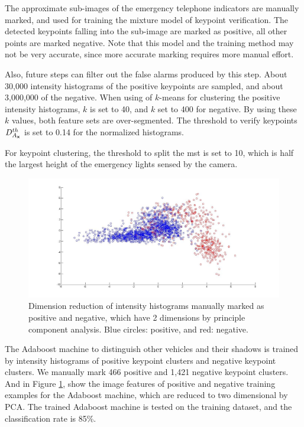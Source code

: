   
  The approximate sub-images of the emergency telephone indicators are manually marked, and used for training the mixture model of keypoint verification. The detected keypoints falling into the sub-image are marked as positive, all other points are marked negative. Note that this model and the training method may not be very accurate, since more accurate marking requires more manual effort.
  
  Also, future steps can filter out the false alarms produced by this step.  About 30,000 intensity histograms of the positive keypoints are sampled, and about 3,000,000 of the negative. When using of $k$-means for clustering the positive intensity histograms, $k$ is set to 40, and $k$ set to 400 for negative. By using these $k$ values,  both feature sets are over-segmented. The threshold to verify keypoints $D^{th}_{A_{\bf{x}}}$ is set to 0.14 for the normalized histograms.

 


For keypoint clustering, the threshold to split the mst is set to 10, which is half the largest height of the emergency lights sensed by the camera.

\begin{figure}
\includegraphics[width=1\textwidth,bb=0 0 1367 651]{untitled.jpg}
\caption[Positive and negative training examples]{Dimension reduction of intensity histograms manually marked as positive and negative, which have 2 dimensions by principle component analysis. Blue circles: positive, and red: negative.}
\label{ex1:v}
\end{figure}




 The Adaboost machine to distinguish other vehicles and their shadows is trained by intensity histograms of positive keypoint clusters and negative keypoint clusters. We manually mark 466 positive  and 1,421 negative keypoint clusters. And in Figure \ref{ex1:v}, show the image features of positive and negative training examples for the Adaboost machine, which are reduced to two dimensional by PCA. The trained Adaboost machine is tested on the training dataset, and the classification rate is 85\%.

